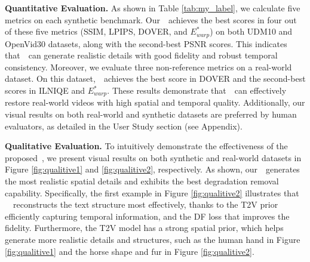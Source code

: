 \noindent
\textbf{Quantitative Evaluation.}
As shown in Table \ref{tab:my_label}, we calculate five metrics on each synthetic benchmark. Our~\name~achieves the best scores in four out of these five metrics (SSIM, LPIPS, DOVER, and $E^*_{warp}$) on both UDM10 and OpenVid30 datasets, along with the second-best PSNR scores. This indicates that~\name~can generate realistic details with good fidelity and robust temporal consistency.
Moreover, we evaluate three non-reference metrics on a real-world dataset. On this dataset,~\name~achieves the best score in DOVER and the second-best scores in ILNIQE and $E^*_{warp}$. These results demonstrate that~\name~can effectively restore real-world videos with high spatial and temporal quality.
Additionally, our visual results on both real-world and synthetic datasets are preferred by human evaluators, as detailed in the User Study section (see Appendix).

\vspace{-0.3mm}
\noindent
\textbf{Qualitative Evaluation.}
To intuitively demonstrate the effectiveness of the proposed~\name, we present visual results on both synthetic and real-world datasets in Figure \ref{fig:qualitive1} and \ref{fig:qualitive2}, respectively. As shown, our~\name~generates the most realistic spatial details and exhibits the best degradation removal capability. Specifically, the first example in Figure \ref{fig:qualitive2} illustrates that ~\name~reconstructs the text structure most effectively, thanks to the T2V prior efficiently capturing temporal information, and the DF loss that improves the fidelity. Furthermore, the T2V model has a strong spatial prior, which helps generate more realistic details and structures, such as the human hand in Figure \ref{fig:qualitive1} and the horse shape and fur in Figure \ref{fig:qualitive2}.

